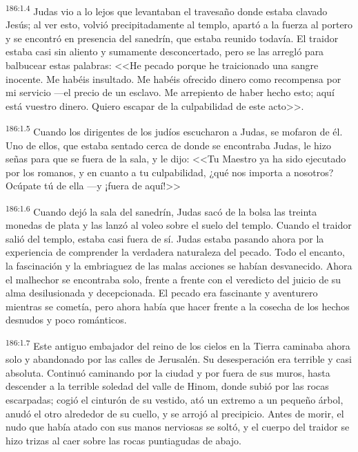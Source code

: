 \par 
\textsuperscript{186:1.4} Judas vio a lo lejos que levantaban el travesaño donde estaba clavado Jesús; al ver esto, volvió precipitadamente al templo, apartó a la fuerza al portero y se encontró en presencia del sanedrín, que estaba reunido todavía. El traidor estaba casi sin aliento y sumamente desconcertado, pero se las arregló para balbucear estas palabras: <<He pecado porque he traicionado una sangre inocente. Me habéis insultado. Me habéis ofrecido dinero como recompensa por mi servicio ---el precio de un esclavo. Me arrepiento de haber hecho esto; aquí está vuestro dinero. Quiero escapar de la culpabilidad de este acto>>.

\par 
\textsuperscript{186:1.5} Cuando los dirigentes de los judíos escucharon a Judas, se mofaron de él. Uno de ellos, que estaba sentado cerca de donde se encontraba Judas, le hizo señas para que se fuera de la sala, y le dijo: <<Tu Maestro ya ha sido ejecutado por los romanos, y en cuanto a tu culpabilidad, ¿qué nos importa a nosotros? Ocúpate tú de ella ---y ¡fuera de aquí!>>

\par 
\textsuperscript{186:1.6} Cuando dejó la sala del sanedrín, Judas sacó de la bolsa las treinta monedas de plata y las lanzó al voleo sobre el suelo del templo. Cuando el traidor salió del templo, estaba casi fuera de sí. Judas estaba pasando ahora por la experiencia de comprender la verdadera naturaleza del pecado. Todo el encanto, la fascinación y la embriaguez de las malas acciones se habían desvanecido. Ahora el malhechor se encontraba solo, frente a frente con el veredicto del juicio de su alma desilusionada y decepcionada. El pecado era fascinante y aventurero mientras se cometía, pero ahora había que hacer frente a la cosecha de los hechos desnudos y poco románticos.

\par 
\textsuperscript{186:1.7} Este antiguo embajador del reino de los cielos en la Tierra caminaba ahora solo y abandonado por las calles de Jerusalén. Su desesperación era terrible y casi absoluta. Continuó caminando por la ciudad y por fuera de sus muros, hasta descender a la terrible soledad del valle de Hinom, donde subió por las rocas escarpadas; cogió el cinturón de su vestido, ató un extremo a un pequeño árbol, anudó el otro alrededor de su cuello, y se arrojó al precipicio. Antes de morir, el nudo que había atado con sus manos nerviosas se soltó, y el cuerpo del traidor se hizo trizas al caer sobre las rocas puntiagudas de abajo.


